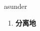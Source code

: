 
\begin{frame}
{\huge asunder}
\begin{center}
\begin{enumerate}\Large
  \item \textbf{分离地}
\end{enumerate}
\end{center}
\end{frame}
